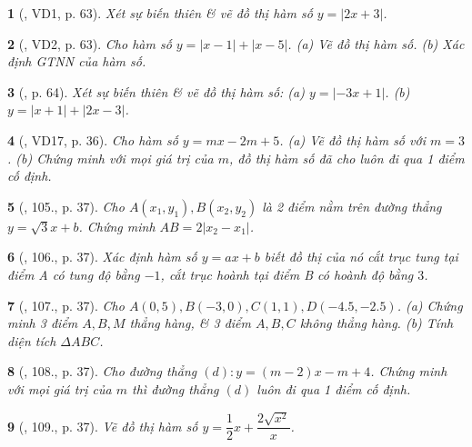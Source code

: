 \documentclass{article}
\newtheorem{baitoan}{}
\begin{document}
\begin{baitoan}[\cite{Binh_boi_duong_Toan_9_tap_1}, VD1, p. 63]
	Xét sự biến thiên \& vẽ đồ thị hàm số $y = |2x + 3|$.
\end{baitoan}

\begin{baitoan}[\cite{Binh_boi_duong_Toan_9_tap_1}, VD2, p. 63]
	Cho hàm số $y = |x - 1| + |x - 5|$. (a) Vẽ đồ thị hàm số. (b) Xác định {\rm GTNN} của hàm số.
\end{baitoan}

\begin{baitoan}[\cite{Binh_boi_duong_Toan_9_tap_1}, p. 64]
	Xét sự biến thiên \& vẽ đồ thị hàm số: (a) $y = |-3x + 1|$. (b) $y = |x + 1| + |2x - 3|$.
\end{baitoan}

\begin{baitoan}[\cite{Tuyen_Toan_9_old}, VD17, p. 36]
	Cho hàm số $y = mx - 2m + 5$. (a) Vẽ đồ thị hàm số với $m = 3$. (b) Chứng minh với mọi giá trị của $m$, đồ thị hàm số đã cho luôn đi qua 1 điểm cố định.
\end{baitoan}

\begin{baitoan}[\cite{Tuyen_Toan_9_old}, 105., p. 37]
	Cho $A(x_1,y_1),B(x_2,y_2)$ là 2 điểm nằm trên đường thẳng $y = \sqrt{3}x + b$. Chứng minh $AB = 2|x_2 - x_1|$.
\end{baitoan}

\begin{baitoan}[\cite{Tuyen_Toan_9_old}, 106., p. 37]
	Xác định hàm số $y = ax + b$ biết đồ thị của nó cắt trục tung tại điểm A có tung độ bằng $-1$, cắt trục hoành tại điểm B có hoành độ bằng $3$.
\end{baitoan}

\begin{baitoan}[\cite{Tuyen_Toan_9_old}, 107., p. 37]
	Cho $A(0,5),B(-3,0),C(1,1),D(-4.5,-2.5)$. (a) Chứng minh 3 điểm $A,B,M$ thẳng hàng, \& 3 điểm $A,B,C$ không thẳng hàng. (b) Tính diện tích $\Delta ABC$.
\end{baitoan}

\begin{baitoan}[\cite{Tuyen_Toan_9_old}, 108., p. 37]
	Cho đường thẳng $(d):y = (m - 2)x - m + 4$. Chứng minh với mọi giá trị của $m$ thì đường thẳng $(d)$ luôn đi qua 1 điểm cố định.
\end{baitoan}

\begin{baitoan}[\cite{Tuyen_Toan_9_old}, 109., p. 37]
	Vẽ đồ thị hàm số $y = \dfrac{1}{2}x + \dfrac{2\sqrt{x^2}}{x}$.
\end{baitoan}
\end{document}
